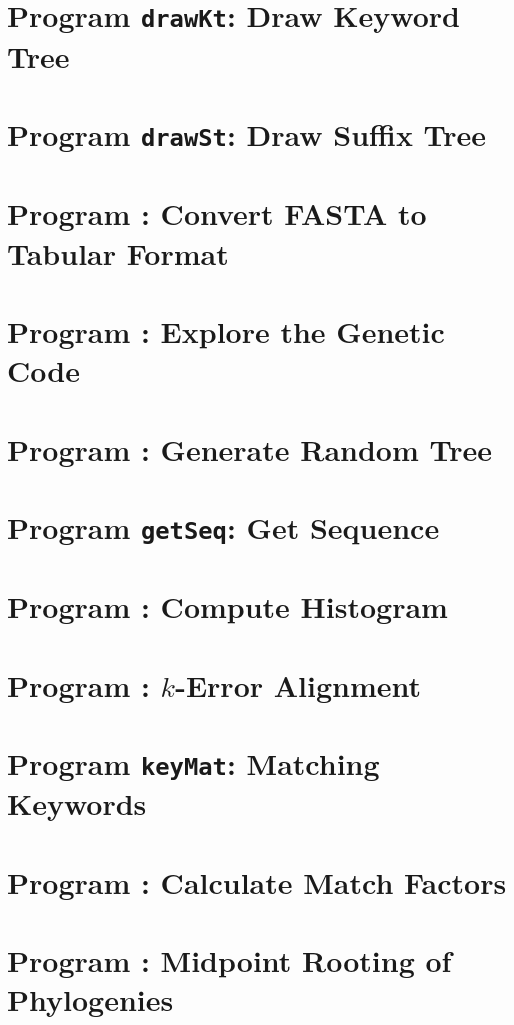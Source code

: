 \documentclass[a4paper]{report}
\begin{document}
\chapter{Program \texttt{drawKt}: Draw Keyword Tree}\label{ch:dkt}

\chapter{Program \texttt{drawSt}: Draw Suffix Tree}\label{ch:dst}

\chapter{Program : Convert FASTA to Tabular
  Format}\label{ch:f2t}

\chapter{Program : Explore the Genetic Code}\label{ch:gc}

\chapter{Program : Generate Random Tree}\label{ch:gt}

\chapter{Program \texttt{getSeq}: Get Sequence}\label{ch:get}

\chapter{Program : Compute Histogram}\label{ch:his}

\chapter{Program : $k$-Error Alignment}\label{ch:ke}

\chapter{Program \texttt{keyMat}: Matching Keywords}\label{ch:km}

\chapter{Program : Calculate Match Factors}\label{ch:ma}

\chapter{Program : Midpoint Rooting of
  Phylogenies}\label{ch:mr}

\end{document}
